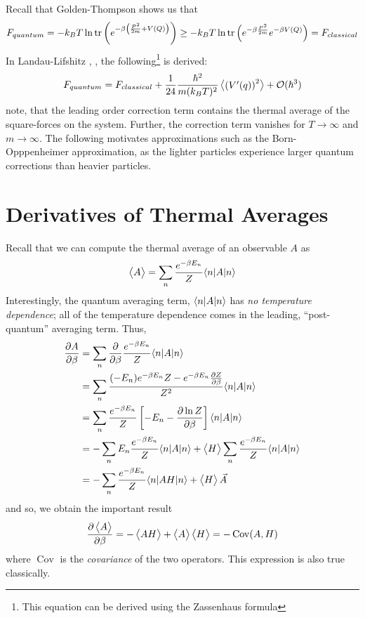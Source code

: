Recall that Golden-Thompson shows us that
\[F_{quantum} = -k_BT\ln \operatorname{tr}\left(e^{-\beta\left(\frac{P^2}{2m}+V(Q)\right)}\right)\geq -k_BT\ln \operatorname{tr}\left(e^{-\beta\frac{P^2}{2m}}e^{-\beta V(Q)}\right) = F_{classical}\]
In Landau-Lifshitz \relax, , the following\footnote{This equation can be derived using the Zassenhaus formula} is derived:
\begin{equation}
	F_{quantum} = F_{classical}+\frac{1}{24}\frac{\hbar^2}{m(k_BT)^2}\left\langle \begin{matrix}\left(V'(q)\right)^2\end{matrix} \right\rangle + \mathcal O(\hbar^3)
\end{equation}
note, that the leading order correction term contains the thermal average of the square-forces on the system. Further, the correction term vanishes for \(T\to\infty\) and \(m\to\infty\). The following motivates approximations such as the Born-Opppenheimer approximation, as the lighter particles experience larger quantum corrections than heavier particles.

\section{Derivatives of Thermal Averages}
Recall that we can compute the thermal average of an observable \(A\) as
\begin{equation}
	\left\langle \begin{matrix}A\end{matrix} \right\rangle = \sum_n \frac{e^{-\beta E_n}}{Z}\langle n\rvert A\lvert n\rangle
\end{equation}
Interestingly, the quantum averaging term, \(\langle n\rvert A\lvert n\rangle\) has \emph{no temperature dependence}; all of the temperature dependence comes in the leading, ``post-quantum'' averaging term. Thus,
\begin{align*}
\frac{\partial A}{\partial \beta} &= \sum_n\frac{\partial }{\partial \beta}\frac{e^{-\beta E_n}}{Z}\langle n\rvert A \lvert n\rangle\\
		&= \sum_n\frac{(-E_n)e^{-\beta E_n}Z-e^{-\beta E_n}\frac{\partial Z}{\partial \beta}}{Z^2}\langle n\rvert A\lvert n\rangle\\
		&= \sum_n\frac{e^{-\beta E_n}}{Z}\left[-E_n-\frac{\partial \ln Z}{\partial \beta}\right]\langle n\rvert A \lvert n\rangle\\
		&= -\sum_n E_n \frac{e^{-\beta E_n}}{Z}\langle n\rvert A \lvert n\rangle + \left\langle \begin{matrix}H\end{matrix} \right\rangle\sum_n \frac{e^{-\beta E_n}}{Z}\langle n\rvert A \lvert n\rangle\\
		&=- \sum_n \frac{e^{-\beta E_n}}{Z}\langle n\rvert A H \lvert n\rangle+\left\langle \begin{matrix}H\end{matrix} \right\rangle\vec{A}
\end{align*}
and so, we obtain the important result
\begin{equation}
	\frac{\partial \left\langle \begin{matrix}A\end{matrix} \right\rangle}{\partial \beta} = -\left\langle \begin{matrix}AH\end{matrix} \right\rangle+\left\langle \begin{matrix}A\end{matrix} \right\rangle\left\langle \begin{matrix}H\end{matrix} \right\rangle = -\operatorname{Cov}(A,H)
\end{equation}
where \(\operatorname{Cov}\) is the \emph{covariance} of the two operators. This expression is also true classically. 

